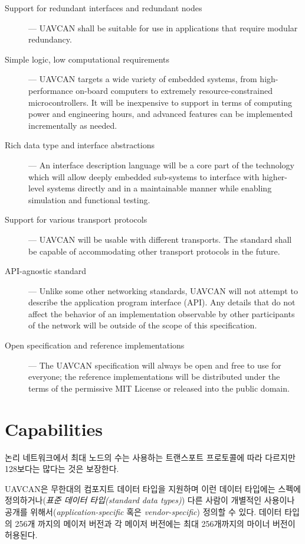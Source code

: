 \begin{description}
    \item[Support for redundant interfaces and redundant nodes] --- UAVCAN shall be suitable for use in
    applications that require modular redundancy.

    \item[Simple logic, low computational requirements] --- UAVCAN targets a wide variety of embedded systems,
    from high-performance on-board computers to extremely resource-constrained microcontrollers.
    It will be inexpensive to support in terms of computing power and engineering hours,
    and advanced features can be implemented incrementally as needed.

    \item[Rich data type and interface abstractions] --- An interface description language will be a core part of
    the technology which will allow deeply embedded sub-systems to interface with higher-level systems directly and
    in a maintainable manner while enabling simulation and functional testing.

    \item[Support for various transport protocols] --- UAVCAN will be usable with different transports.
    The standard shall be capable of accommodating other transport protocols in the future.

    \item[API-agnostic standard] --- Unlike some other networking standards, UAVCAN will not attempt to describe
    the application program interface (API). Any details that do not affect the behavior of an implementation
    observable by other participants of the network will be outside of the scope of this specification.

    \item[Open specification and reference implementations] --- The UAVCAN specification will always be open and
    free to use for everyone; the reference implementations will be distributed under the terms of
    the permissive MIT License or released into the public domain.
\end{description}

\section{Capabilities}

논리 네트워크에서 최대 노드의 수는 사용하는 트랜스포트 프로토콜에 따라 다르지만 128보다는 많다는 것은 보장한다.

UAVCAN은 무한대의 컴포지트 데이터 타입을 지원하며 이런 데이터 타입에는 스펙에 정의하거나(\emph{표준 데이터 타입(standard data types)}) 다른 사람이 개별적인 사용이나 공개를 위해서(\emph{application-specific} 혹은 \emph{vendor-specific}) 정의할 수 있다.
데이터 타입의 256개 까지의 메이저 버전과 각 메이저 버전에는 최대 256개까지의 마이너 버전이 허용된다.

